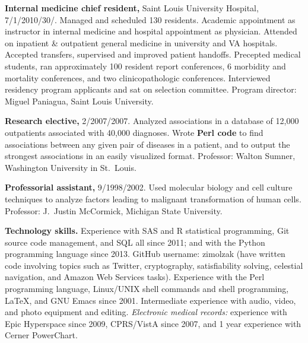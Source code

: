 \documentclass[10pt]{article}
\begin{document}
\textbf{Internal medicine chief resident,} Saint Louis University
Hospital, 7/1/2010\ndash{}/30/. Managed
and scheduled 130 residents. Academic appointment as instructor in
internal medicine and hospital appointment as physician. Attended on
inpatient \& outpatient general medicine in university and VA
hospitals. Accepted transfers, supervised and improved patient
handoffs. Precepted medical students, ran approximately 100 resident
report conferences, 6 morbidity and mortality conferences, and two
clinicopathologic conferences. Interviewed residency program
applicants and sat on selection committee. Program director: Miguel
Paniagua, Saint Louis University.

\textbf{Research elective,} 2/2007/2007. Analyzed associations
in a database of 12,000 outpatients associated with 40,000 diagnoses.
Wrote \textbf{Perl code} to find associations between any given pair of
diseases in a patient, and to output the strongest associations in an
easily visualized format. Professor: Walton Sumner, Washington
University in St.\ Louis.

\textbf{Professorial assistant,} 9/1998/2002. Used molecular
biology and cell culture techniques to analyze factors leading to
malignant transformation of human cells. Professor: J.\ Justin
McCormick, Michigan State University.

\textbf{Technology skills.} Experience with SAS and R statistical
programming, Git source code management, and SQL all since 2011;
and with the Python programming language since 2013. GitHub username:
zimolzak (have written code involving topics such as Twitter, cryptography,
satisfiability solving, celestial navigation, and Amazon Web
Services tasks). Experience with the Perl programming language,
Linux/UNIX shell commands and shell programming, \LaTeX, and GNU Emacs
since 2001. Intermediate experience with audio, video, and photo
equipment and editing. \emph{Electronic medical records:} experience
with Epic Hyperspace since 2009, CPRS/VistA since 2007, and 1 year
experience with Cerner PowerChart.
\end{document}
